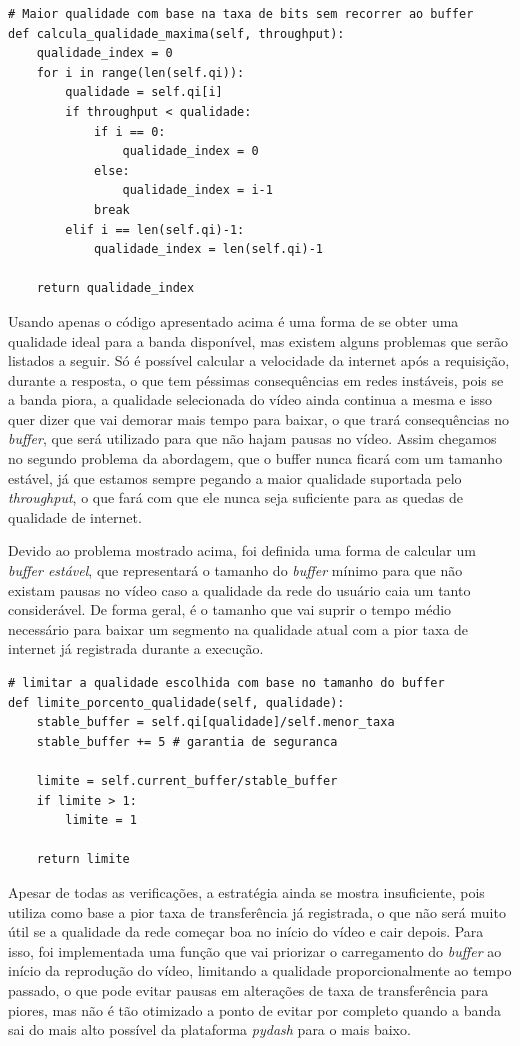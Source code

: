 \documentclass[12pt]{article}
\begin{document}
\begin{lstlisting}
# Maior qualidade com base na taxa de bits sem recorrer ao buffer
def calcula_qualidade_maxima(self, throughput):
    qualidade_index = 0
    for i in range(len(self.qi)):
        qualidade = self.qi[i]
        if throughput < qualidade:
            if i == 0:
                qualidade_index = 0
            else:
                qualidade_index = i-1
            break
        elif i == len(self.qi)-1:
            qualidade_index = len(self.qi)-1

    return qualidade_index
\end{lstlisting}

Usando apenas o código apresentado acima é uma forma de se obter uma qualidade ideal para a banda disponível, mas existem alguns problemas que serão listados a seguir. Só é possível calcular a velocidade da internet após a requisição, durante a resposta, o que tem péssimas consequências em redes instáveis, pois se a banda piora, a qualidade selecionada do vídeo ainda continua a mesma e isso quer dizer que vai demorar mais tempo para baixar, o que trará consequências no \textit{buffer}, que será utilizado para que não hajam pausas no vídeo. Assim chegamos no segundo problema da abordagem, que o buffer nunca ficará com um tamanho estável, já que estamos sempre pegando a maior qualidade suportada pelo \textit{throughput}, o que fará com que ele nunca seja suficiente para as quedas de qualidade de internet.

Devido ao problema mostrado acima, foi definida uma forma de calcular um \textit{buffer estável}, que representará o tamanho do \textit{buffer} mínimo para que não existam pausas no vídeo caso a qualidade da rede do usuário caia um tanto considerável. De forma geral, é o tamanho que vai suprir o tempo médio necessário para baixar um segmento na qualidade atual com a pior taxa de internet já registrada durante a execução.

\begin{lstlisting}
# limitar a qualidade escolhida com base no tamanho do buffer
def limite_porcento_qualidade(self, qualidade):
    stable_buffer = self.qi[qualidade]/self.menor_taxa
    stable_buffer += 5 # garantia de seguranca

    limite = self.current_buffer/stable_buffer
    if limite > 1:
        limite = 1

    return limite
\end{lstlisting}

Apesar de todas as verificações, a estratégia ainda se mostra insuficiente, pois utiliza como base a pior taxa de transferência já registrada, o que não será muito útil se a qualidade da rede começar boa no início do vídeo e cair depois. Para isso, foi implementada uma função que vai priorizar o carregamento do \textit{buffer} ao início da reprodução do vídeo, limitando a qualidade proporcionalmente ao tempo passado, o que pode evitar pausas em alterações de taxa de transferência para piores, mas não é tão otimizado a ponto de evitar por completo quando a banda sai do mais alto possível da plataforma \textit{pydash} para o mais baixo. 
\end{document}
